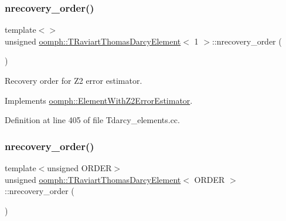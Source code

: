 \subsubsection{\texorpdfstring{nrecovery\+\_\+order()}{nrecovery\_order()}\hspace{0.1cm}{\footnotesize\ttfamily [2/3]}}
{\footnotesize\ttfamily template$<$$>$ \\
unsigned \hyperlink{classoomph_1_1TRaviartThomasDarcyElement}{oomph\+::\+T\+Raviart\+Thomas\+Darcy\+Element}$<$ 1 $>$\+::nrecovery\+\_\+order (\begin{DoxyParamCaption}{ }\end{DoxyParamCaption})\hspace{0.3cm}{\ttfamily [virtual]}}



Recovery order for Z2 error estimator. 



Implements \hyperlink{classoomph_1_1ElementWithZ2ErrorEstimator_af39480835bd3e0f6b2f4f7a9a4044798}{oomph\+::\+Element\+With\+Z2\+Error\+Estimator}.



Definition at line 405 of file Tdarcy\+\_\+elements.\+cc.

\mbox{\label{classoomph_1_1TRaviartThomasDarcyElement_adb1607a15629d5b7314ddd29bd61fc15}} 
\subsubsection{\texorpdfstring{nrecovery\+\_\+order()}{nrecovery\_order()}\hspace{0.1cm}{\footnotesize\ttfamily [3/3]}}
{\footnotesize\ttfamily template$<$unsigned O\+R\+D\+ER$>$ \\
unsigned \hyperlink{classoomph_1_1TRaviartThomasDarcyElement}{oomph\+::\+T\+Raviart\+Thomas\+Darcy\+Element}$<$ O\+R\+D\+ER $>$\+::nrecovery\+\_\+order (\begin{DoxyParamCaption}{ }\end{DoxyParamCaption})\hspace{0.3cm}{\ttfamily [virtual]}}



